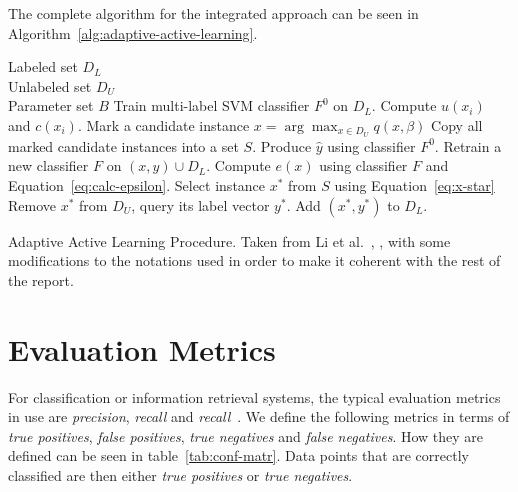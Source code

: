 The complete algorithm for the integrated approach can be seen in Algorithm~\ref{alg:adaptive-active-learning}.

\begin{algorithm}
    \begin{algorithmic}
        \REQUIRE Labeled set $D_L$ \\ 
                 Unlabeled set $D_U$ \\ 
                 Parameter set $B$
        \REPEAT
            \STATE Train multi-label SVM classifier $F^0$ on $D_L$.
                \STATE Compute $u(x_i)$ and $c(x_i)$.
            \ENDFOR
                \STATE Mark a candidate instance $x = \arg\max_{x \in D_U} q(x, \beta)$
            \ENDFOR
            \STATE Copy all marked candidate instances into a set $S$.
                \STATE Produce $\hat{y}$ using classifier $F^0$.
                \STATE Retrain a new classifier $F$ on $(x, \hat{y}) \cup D_L$.
                \STATE Compute $e(x)$ using classifier $F$ and Equation~\ref{eq:calc-epsilon}.
            \ENDFOR
            \STATE Select instance $x^*$ from $S$ using Equation~\ref{eq:x-star}
            \STATE Remove $x^*$ from $D_U$, query its label vector $y^*$.
            \STATE Add $(x^*, y^*)$ to $D_L$.
    \end{algorithmic}

    \caption{Adaptive Active Learning Procedure. Taken from Li et al\@.~\cite{li2013active}, , with some modifications to the notations used in order to make it coherent with the rest of the report.}
    \label{alg:adaptive-active-learning}
\end{algorithm}


\section{Evaluation Metrics}\label{sec:evaluation-metrics}

For classification or information retrieval systems, the typical evaluation metrics in use are \textit{precision}, \textit{recall} and \textit{recall}~\cite{jiang2012information}.
We define the following metrics in terms of \textit{true positives}, \textit{false positives}, \textit{true negatives} and \textit{false negatives}.
How they are defined can be seen in table~\ref{tab:conf-matr}.
Data points that are correctly classified are then either \textit{true positives} or \textit{true negatives}.

